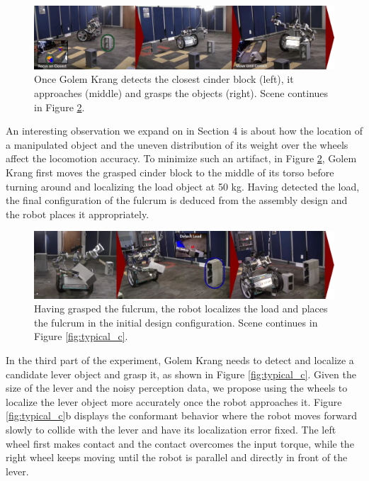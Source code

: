 \documentclass[runningheads,a4paper]{llncs}
\begin{document}
\begin{figure}[ht!] 
  \centering
  \includegraphics[width=1.0\linewidth]{Figures/a.png}
  \caption{Once Golem Krang detects the closest cinder block (left), it approaches (middle) and grasps
  the objects (right). Scene continues in Figure \ref{fig:typical_b}.}
  \label{fig:typical_a}
\end{figure}

An interesting observation we expand on in Section 4 is about how the location of a manipulated object
and the uneven distribution of its weight over the wheels affect the locomotion accuracy. To minimize
such an artifact, in Figure \ref{fig:typical_b}, Golem Krang first moves the grasped cinder block 
to the middle of its torso before turning around and localizing the load object at 50 kg. Having
detected the load, the final configuration of the fulcrum is deduced from the assembly design and
the robot places it appropriately. 

\begin{figure}[ht!] 
  \centering
  \includegraphics[width=1.0\linewidth]{Figures/b.png}
  \caption{Having grasped the fulcrum, the robot localizes the load and places the fulcrum
		in the initial design configuration. Scene continues in Figure \ref{fig:typical_c}.} 
	\label{fig:typical_b}
\end{figure}

In the third part of the experiment, Golem Krang needs to detect and localize a candidate lever
object and grasp it, as shown in Figure \ref{fig:typical_c}. Given the size of the lever and the
noisy perception data, we propose using the wheels to localize the lever object more accurately
once the robot approaches it. Figure \ref{fig:typical_c}b displays the conformant behavior where the 
robot moves forward slowly to collide with the lever and have its localization error fixed. The
left wheel first makes contact and the contact overcomes the input torque, while the right wheel 
keeps moving until the robot is parallel and directly in front of the lever. 
\end{document}

